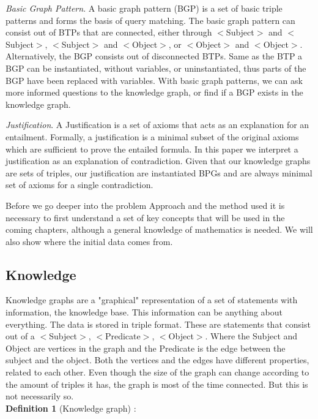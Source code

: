 \documentclass{article}
\begin{document}
\textit{Basic Graph Pattern}. A basic graph pattern (BGP) is a set of basic triple patterns and forms the basis of query matching. The basic graph pattern
can consist out of BTPs that are connected, either through $<$Subject$>$ and $<$Subject$>$, $<$Subject$>$ and $<$Object$>$, or $<$Object$>$ and $<$Object$>$.
Alternatively, the BGP consists out of disconnected BTPs. Same as the BTP a BGP can be instantiated, without variables, or uninstantiated, thus parts of the BGP have been replaced with variables. With basic graph patterns, we can ask more informed questions to the knowledge graph, or find if a BGP exists in the knowledge graph.

\textit{Justification}. A Justification\cite{Horridge:2009} is a set of axioms that acts as an explanation for an entailment.
Formally, a justification is a minimal subset of the original axioms which are sufficient to prove the entailed formula. In this paper we interpret a justification as an explanation of contradiction. Given that our knowledge graphs are sets of triples, our justification are instantiated BPGs and are always minimal set of axioms for a single contradiction. 

Before we go deeper into the problem Approach and the method used it is necessary to first understand a set of key concepts that will be used in the coming chapters, although a general knowledge of mathematics is needed. We will also show where the initial data comes from.

\subsection{Knowledge}
Knowledge graphs are a "graphical" representation of a set of statements with information, the knowledge base. This information can be anything about everything. The data is stored in triple format. These are statements that consist out of a $<$Subject$>$, $<$Predicate$>$, $<$Object$>$. Where the Subject and Object are vertices in the graph and the Predicate is the edge between the subject and the object. Both the vertices and the edges have different properties, related to each other. Even though the size of the graph can change according to the amount of triples it has, the graph is most of the time connected. But this is not necessarily so. \\

\textbf{Definition 1} (Knowledge graph) :\\
\end{document}
